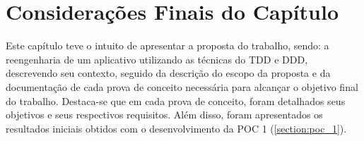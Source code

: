 \section{Considerações Finais do Capítulo}
\label{section:consideracoes_finais_proposta}

Este capítulo teve o intuito de apresentar a proposta do trabalho, sendo: a reengenharia de um aplicativo utilizando 
as técnicas do TDD e DDD, descrevendo seu contexto, seguido da descrição do escopo da proposta e da documentação 
de cada prova de conceito necessária para alcançar o objetivo final do trabalho. Destaca-se que em cada prova de conceito, 
foram detalhados seus objetivos e seus respectivos requisitos. Além disso, foram apresentados os resultados 
iniciais obtidos com o desenvolvimento da POC 1 (\ref{section:poc_1}).
